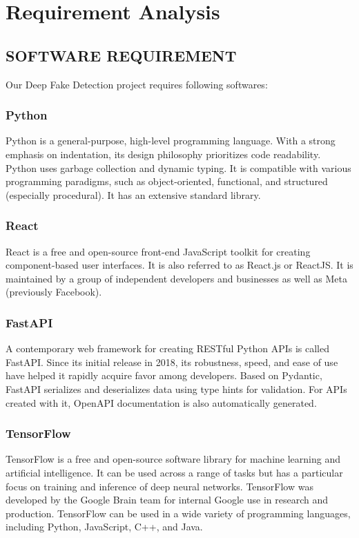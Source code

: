       \chapter{Requirement Analysis}
        \section{SOFTWARE REQUIREMENT}
            Our Deep Fake Detection project requires following softwares:
            \subsection{Python}
                Python is a general-purpose, high-level programming language. With a strong emphasis on indentation, its design philosophy prioritizes code readability. Python uses garbage collection and dynamic typing. It is compatible with various programming paradigms, such as object-oriented, functional, and structured (especially procedural). It has an extensive standard library.

            \subsection{React}
                React is a free and open-source front-end JavaScript toolkit for creating component-based user interfaces. It is also referred to as React.js or ReactJS. It is maintained by a group of independent developers and businesses as well as Meta (previously Facebook).

            \subsection{FastAPI}
                A contemporary web framework for creating RESTful Python APIs is called FastAPI. Since its initial release in 2018, its robustness, speed, and ease of use have helped it rapidly acquire favor among developers. Based on Pydantic, FastAPI serializes and deserializes data using type hints for validation. For APIs created with it, OpenAPI documentation is also automatically generated.

            \subsection{TensorFlow}
                TensorFlow is a free and open-source software library for machine learning and artificial intelligence. It can be used across a range of tasks but has a particular focus on training and inference of deep neural networks. TensorFlow was developed by the Google Brain team for internal Google use in research and production. TensorFlow can be used in a wide variety of programming languages, including Python, JavaScript, C++, and Java.

